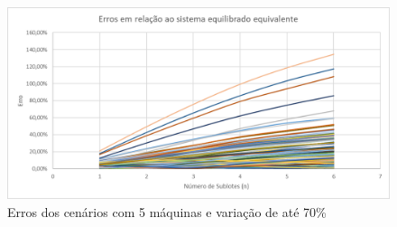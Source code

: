 \begin{figure}[!ht]
    \centering
    \includegraphics[width=12cm]{Resultados/Figuras/e05_70}
    \caption{Erros dos cenários com 5 máquinas e variação de até 70\%}
    \label{fig:e05_70}
\end{figure}